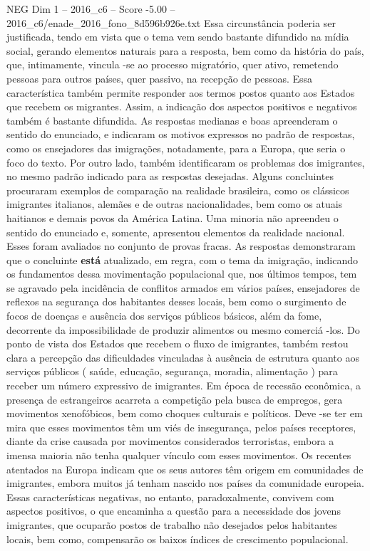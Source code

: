 \begin{textsample}{NEG Dim 1 – 2016\_c6 – Score -5.00 – 2016\_c6/enade\_2016\_fono\_8d596b926e.txt}
Essa circunstância poderia ser justificada, tendo em vista que o tema vem sendo bastante difundido na mídia social, gerando elementos naturais para a resposta, bem como da história do país, que, intimamente, vincula -se ao processo migratório, quer ativo, remetendo pessoas para outros países, quer passivo, na recepção de pessoas.
Essa característica também permite responder aos termos postos quanto aos Estados que recebem os migrantes.
Assim, a indicação dos aspectos positivos e negativos também é bastante difundida.
As respostas medianas e boas apreenderam o sentido do enunciado, e indicaram os motivos expressos no padrão de respostas, como os ensejadores das imigrações, notadamente, para a Europa, que seria o foco do texto.
Por outro lado, também identificaram os problemas dos imigrantes, no mesmo padrão indicado para as respostas desejadas.
Alguns concluintes procuraram exemplos de comparação na realidade brasileira, como os clássicos imigrantes italianos, alemães e de outras nacionalidades, bem como os atuais haitianos e demais povos da América Latina.
Uma minoria não apreendeu o sentido do enunciado e, somente, apresentou elementos da realidade nacional.
Esses foram avaliados no conjunto de provas fracas.
As respostas demonstraram que o concluinte \textbf{está} atualizado, em regra, com o tema da imigração, indicando os fundamentos dessa movimentação populacional que, nos últimos tempos, tem se agravado pela incidência de conflitos armados em vários países, ensejadores de reflexos na segurança dos habitantes desses locais, bem como o surgimento de focos de doenças e ausência dos serviços públicos básicos, além da fome, decorrente da impossibilidade de produzir alimentos ou mesmo comerciá -los.
Do ponto de vista dos Estados que recebem o fluxo de imigrantes, também restou clara a percepção das dificuldades vinculadas à ausência de estrutura quanto aos serviços públicos ( saúde, educação, segurança, moradia, alimentação ) para receber um número expressivo de imigrantes.
Em época de recessão econômica, a presença de estrangeiros acarreta a competição pela busca de empregos, gera movimentos xenofóbicos, bem como choques culturais e políticos.
Deve -se ter em mira que esses movimentos têm um viés de insegurança, pelos países receptores, diante da crise causada por movimentos considerados terroristas, embora a imensa maioria não tenha qualquer vínculo com esses movimentos.
Os recentes atentados na Europa indicam que os seus autores têm origem em comunidades de imigrantes, embora muitos já tenham nascido nos países da comunidade europeia.
Essas características negativas, no entanto, paradoxalmente, convivem com aspectos positivos, o que encaminha a questão para a necessidade dos jovens imigrantes, que ocuparão postos de trabalho não desejados pelos habitantes locais, bem como, compensarão os baixos índices de crescimento populacional.

\end{textsample}
